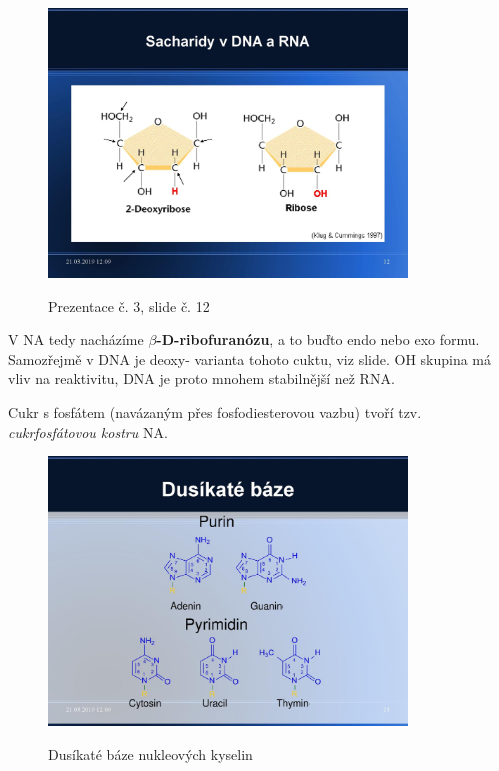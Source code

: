 \documentclass[DIV=8]{scrreprt}
\begin{document}
\begin{figure}
    \caption{Prezentace č. 3, slide č. 12}
    \includegraphics[width=0.85\textwidth]{slides-3/slide-12.jpg}
    \centering
    \label{slides-3-slide-12}
\end{figure}

V NA tedy nacházíme \textbf{\(\beta\)-D-ribofuranózu}, a to buďto endo nebo exo formu. Samozřejmě v DNA je deoxy- varianta tohoto cuktu, viz slide. OH skupina má vliv na reaktivitu, DNA je proto mnohem stabilnější než RNA.

Cukr s fosfátem (navázaným přes fosfodiesterovou vazbu) tvoří tzv. \emph{cukrfosfátovou kostru} NA.

\begin{figure}
    \caption{Dusíkaté báze nukleových kyselin}
    \includegraphics[width=0.85\textwidth]{slides-3/slide-13.jpg}
    \centering
    \label{}
\end{figure}
\end{document}
